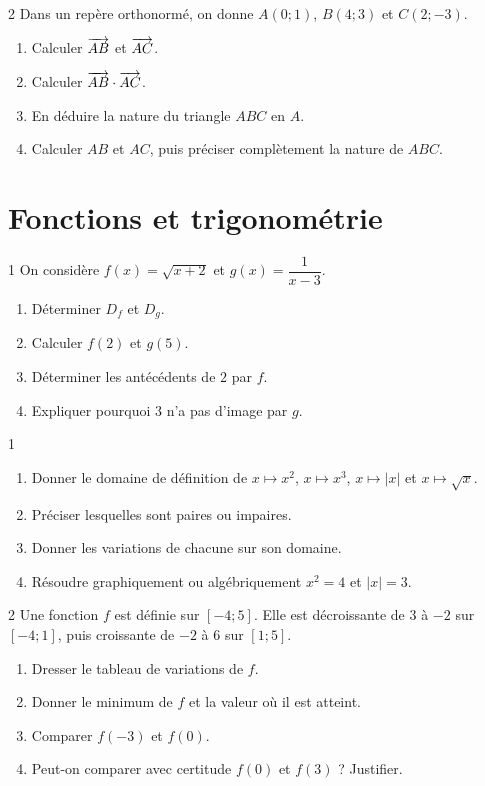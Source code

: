 \begin{exo}{2}
Dans un repère orthonormé, on donne $A(0;1)$, $B(4;3)$ et $C(2;-3)$.
\begin{enumerate}
  \item Calculer $\overrightarrow{AB}$ et $\overrightarrow{AC}$.
  \item Calculer $\overrightarrow{AB}\cdot\overrightarrow{AC}$.
  \item En déduire la nature du triangle $ABC$ en $A$.
  \item Calculer $AB$ et $AC$, puis préciser complètement la nature de $ABC$.
\end{enumerate}
\end{exo}

\section{Fonctions et trigonométrie}

\begin{exo}{1}
On considère $f(x)=\sqrt{x+2}$ et $g(x)=\dfrac{1}{x-3}$.
\begin{enumerate}
  \item Déterminer $D_f$ et $D_g$.
  \item Calculer $f(2)$ et $g(5)$.
  \item Déterminer les antécédents de $2$ par $f$.
  \item Expliquer pourquoi $3$ n'a pas d'image par $g$.
\end{enumerate}
\end{exo}

\begin{exo}{1}
\begin{enumerate}
  \item Donner le domaine de définition de $x\mapsto x^2$, $x\mapsto x^3$,
  $x\mapsto|x|$ et $x\mapsto\sqrt{x}$.
  \item Préciser lesquelles sont paires ou impaires.
  \item Donner les variations de chacune sur son domaine.
  \item Résoudre graphiquement ou algébriquement $x^2=4$ et $|x|=3$.
\end{enumerate}
\end{exo}

\begin{exo}{2}
Une fonction $f$ est définie sur $[-4;5]$. Elle est décroissante de $3$ à
$-2$ sur $[-4;1]$, puis croissante de $-2$ à $6$ sur $[1;5]$.
\begin{enumerate}
  \item Dresser le tableau de variations de $f$.
  \item Donner le minimum de $f$ et la valeur où il est atteint.
  \item Comparer $f(-3)$ et $f(0)$.
  \item Peut-on comparer avec certitude $f(0)$ et $f(3)$ ? Justifier.
\end{enumerate}
\end{exo}

